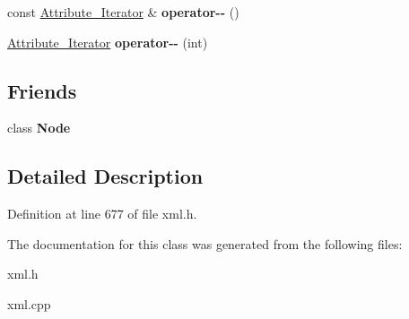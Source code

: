 \begin{DoxyCompactItemize}
\item 
\hypertarget{classphys_1_1xml_1_1Attribute__Iterator_a35b3fa2a3d993d6fea52fa3d1dedc34e}{
const \hyperlink{classphys_1_1xml_1_1Attribute__Iterator}{Attribute\_\-Iterator} \& {\bfseries operator-\/-\/} ()}
\label{da/d4f/classphys_1_1xml_1_1Attribute__Iterator_a35b3fa2a3d993d6fea52fa3d1dedc34e}

\item 
\hypertarget{classphys_1_1xml_1_1Attribute__Iterator_a308c8c83033c6b4f2959244e4b7ee369}{
\hyperlink{classphys_1_1xml_1_1Attribute__Iterator}{Attribute\_\-Iterator} {\bfseries operator-\/-\/} (int)}
\label{da/d4f/classphys_1_1xml_1_1Attribute__Iterator_a308c8c83033c6b4f2959244e4b7ee369}

\end{DoxyCompactItemize}
\subsection*{Friends}
\begin{DoxyCompactItemize}
\item 
\hypertarget{classphys_1_1xml_1_1Attribute__Iterator_a6db9d28bd448a131448276ee03de1e6d}{
class {\bfseries Node}}
\label{da/d4f/classphys_1_1xml_1_1Attribute__Iterator_a6db9d28bd448a131448276ee03de1e6d}

\end{DoxyCompactItemize}


\subsection{Detailed Description}


Definition at line 677 of file xml.h.



The documentation for this class was generated from the following files:\begin{DoxyCompactItemize}
\item 
xml.h\item 
xml.cpp\end{DoxyCompactItemize}
